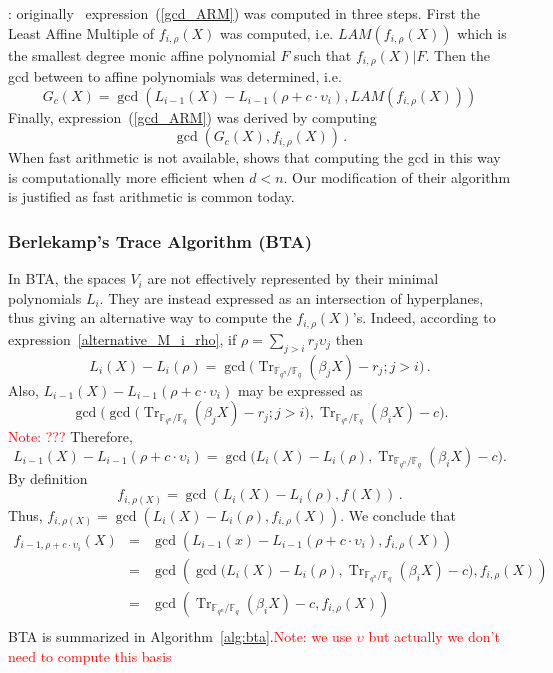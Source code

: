 \documentclass{article}
\newcommand{\ff}[1]{\mathbb{F}_{#1}}
\newcommand{\qq}{q}
\newcommand{\nn}{n}
\newcommand{\qn}{{\qq^\nn}}
\newcommand{\basef}{\ff{\qq}}
\newcommand{\extf}{\ff{\qn}}
\DeclareMathOperator{\Tr}{Tr}
\newcounter{algo}
\newcommand{\Notes}[1]{\textcolor{red}{Note: #1}}
\begin{document}
: originally~\cite{van1989geometric} expression~(\ref{gcd_ARM}) was computed in three steps. First the Least Affine Multiple of 
$f_{i,\rho}(X)$ was computed, i.e. $LAM(f_{i,\rho}(X))$ which is  the smallest degree monic affine polynomial $F$ such that $f_{i,\rho}(X)|F$. Then the gcd between to affine polynomials was determined, i.e. 
$$G_c(X)=\gcd(L_{i-1}(X)-L_{i-1}(\rho+c \cdot \upsilon_i),LAM(f_{i,\rho}(X)) ) $$
Finally, expression~(\ref{gcd_ARM}) was derived by computing
$$\gcd(G_c(X), f_{i,\rho}(X))\,.$$
When fast arithmetic is not available, \cite{van1989geometric} shows that computing the gcd in this way is computationally more efficient when $d<n$. Our modification of their algorithm is justified as fast arithmetic is common today.




\subsubsection{Berlekamp's Trace Algorithm (BTA)}
\label{sec:BTA}
In BTA, the spaces $V_{i}$ are not effectively represented by their minimal polynomials $L_i$. They are instead expressed as an intersection of hyperplanes, thus giving an alternative way to compute the $f_{i,\rho}(X)$'s. Indeed, according to expression~\eqref{alternative_M_i_rho}, if $\rho=\sum_{j>i}r_j\upsilon_j$ then
$$L_i(X)-L_i(\rho)=\gcd\bigl(\Tr_{\extf/\basef}(\beta_j X) -r_j ;j>i\bigr)\,.$$
Also, $L_{i-1}(X)-L_{i-1}(\rho +c \cdot \upsilon_i)$ may be expressed as
$$
\gcd\bigl(\gcd\bigl(\Tr_{\extf/\basef}(\beta_j X) -r_j ;j>i\bigr), \Tr_{\extf/\basef}(\beta_i X) -c  \bigr).
$$
\Notes{???}
Therefore, 
\begin{equation}
\label{alt_formula}
L_{i-1}(X)-L_{i-1}(\rho +c \cdot \upsilon_i)=
\gcd\bigl(L_i(X)-L_i(\rho), \Tr_{\extf/\basef}(\beta_i X) -c  \bigr).
\end{equation}
By definition 
$$f_{i,\rho(X)}=\gcd(L_i(X)-L_i(\rho),f(X))\,.$$ 
Thus, $f_{i,\rho(X)}=\gcd(L_i(X)-L_i(\rho),f_{i,\rho}(X))$.
We conclude that 
$$
\begin{array}{lll}
f_{i-1,\rho+c \cdot \upsilon_i}(X)&=&\gcd(L_{i-1}(x)-L_{i-1}(\rho +c \cdot \upsilon_i) ,f_{i,\rho}(X)  ) \\
&=&  \gcd(  \gcd\bigl(L_i(X)-L_i(\rho), \Tr_{\extf/\basef}(\beta_i X) -c  \bigr)     ,  f_{i,\rho}(X) )    \\
&=&  \gcd( \Tr_{\extf/\basef}(\beta_i X) -c ,  f_{i,\rho}(X) )    \\
\end{array}
$$
BTA is summarized in Algorithm~\ref{alg:bta}.\Notes{we use $\upsilon$ but actually we don't need to compute this basis}
\end{document}
